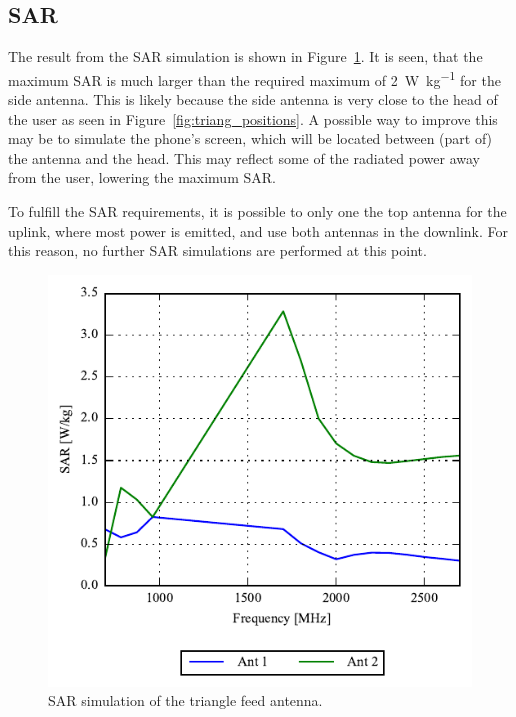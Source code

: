 \FloatBarrier
\subsection{SAR}

The result from the SAR simulation is shown in Figure~\ref{fig:triang_sar_sim}. It is seen, that the maximum SAR is much larger than the required maximum of \SI{2}{W\per kg} for the side antenna. This is likely because the side antenna is very close to the head of the user as seen in Figure~\ref{fig:triang_positions}. A possible way to improve this may be to simulate the phone's screen, which will be located between (part of) the antenna and the head. This may reflect some of the radiated power away from the user, lowering the maximum SAR.

To fulfill the SAR requirements, it is possible to only one the top antenna for the uplink, where most power is emitted, and use both antennas in the downlink. For this reason, no further SAR simulations are performed at this point.

\begin{figure}[htbp]
    \centering
    \includegraphics{img/tech_sol/trianglefeed/sar/sar.pdf}
    \caption{SAR simulation of the triangle feed antenna.}
    \label{fig:triang_sar_sim}
\end{figure}


